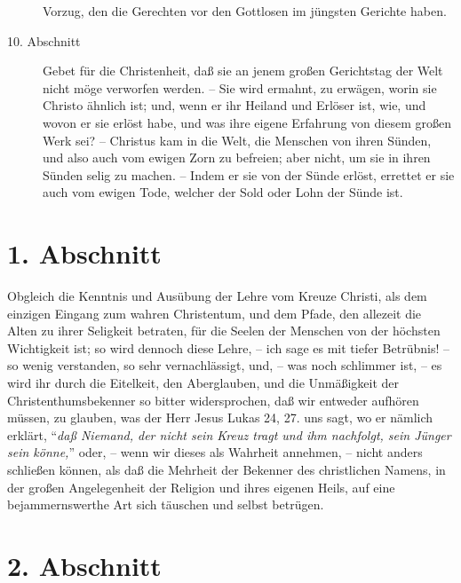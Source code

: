 \begin{description}
Vorzug, den die Gerechten vor den Gottlosen im jüngsten Gerichte haben.
\item[10. Abschnitt] Gebet für die Christenheit, daß sie an jenem großen
Gerichtstag der Welt nicht möge verworfen werden. -- Sie wird ermahnt, zu
erwägen, worin sie Christo ähnlich ist; und, wenn er ihr Heiland und Erlöser
ist, wie, und wovon er sie erlöst habe, und was ihre eigene Erfahrung von diesem
großen Werk sei? -- Christus kam in die Welt, die Menschen von ihren Sünden, und
also auch vom ewigen Zorn zu befreien; aber nicht, um sie in ihren Sünden selig
zu machen. -- Indem er sie von der Sünde erlöst, errettet er sie auch vom ewigen
Tode, welcher der Sold oder Lohn der Sünde ist.
\end{description}
\normalsize


\section{1. Abschnitt}

Obgleich die Kenntnis und Ausübung der Lehre vom Kreuze Christi, als dem
einzigen Eingang zum wahren Christentum, und dem Pfade, den allezeit die Alten
zu ihrer Seligkeit betraten, für die Seelen der Menschen von der höchsten
Wichtigkeit ist; so wird dennoch diese Lehre, -- ich sage es mit tiefer
Betrübnis! -- so wenig verstanden, so sehr vernachlässigt, und, -- was noch
schlimmer ist, -- es wird ihr durch die Eitelkeit, den Aberglauben, und die
Unmäßigkeit der Christenthumsbekenner so bitter widersprochen, daß wir entweder
aufhören müssen, zu glauben, was der Herr Jesus Lukas 24,
27. uns sagt, wo er nämlich erklärt, "`\textit{daß
Niemand, der nicht sein Kreuz tragt und ihm nachfolgt, sein Jünger sein
könne,}"' oder, -- wenn wir dieses als Wahrheit annehmen, -- nicht anders
schließen können, als daß die Mehrheit der Bekenner des christlichen Namens, in
der großen Angelegenheit der Religion und ihres eigenen Heils, auf eine
bejammernswerthe Art sich täuschen und selbst betrügen.

\section{2. Abschnitt}

